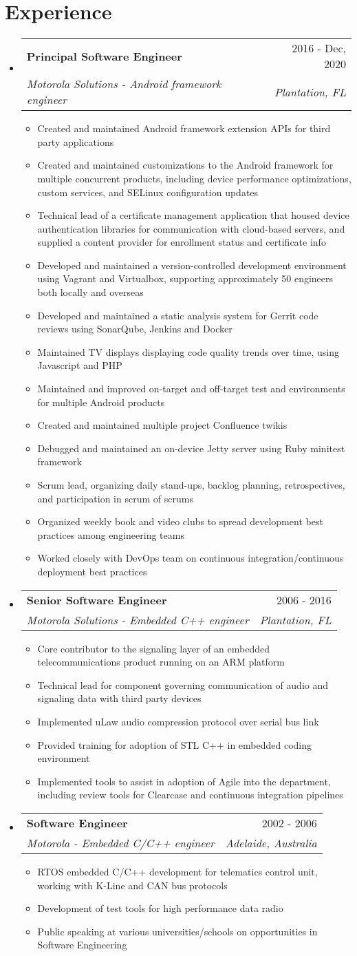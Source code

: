 \documentclass[letterpaper,11pt]{article}
\makeatletter
\newcommand{\resumeItem}[1]{
  \item\small{
    {#1 \vspace{-2pt}}
  }
}
\newcommand{\resumeSubheading}[4]{
  \vspace{-2pt}\item
    \begin{tabular*}{0.97\textwidth}[t]{l@{\extracolsep{\fill}}r}
      \textbf{#1} & #2 \\
      \textit{\small#3} & \textit{\small #4} \\
    \end{tabular*}\vspace{-7pt}
}
\newcommand{\resumeSubHeadingListStart}{\begin{itemize}[leftmargin=0.15in, label={}]}
\newcommand{\resumeSubHeadingListEnd}{\end{itemize}}
\newcommand{\resumeItemListStart}{\begin{itemize}}
\newcommand{\resumeItemListEnd}{\end{itemize}\vspace{-5pt}}
\makeatother
\begin{document}
\section{Experience}
  \resumeSubHeadingListStart
    \resumeSubheading
      {Principal Software Engineer}{2016 - Dec, 2020}
      {Motorola Solutions - Android framework engineer}{Plantation, FL}
      \resumeItemListStart
        \resumeItem{Created and maintained Android framework extension APIs for third party applications}
        \resumeItem{Created and maintained customizations to the Android framework for multiple concurrent products, including device performance optimizations, custom services, and SELinux configuration updates}
        \resumeItem{Technical lead of a certificate management application that housed device authentication libraries for communication with cloud-based servers, and supplied a content provider for enrollment status and certificate info}  
        \resumeItem{Developed and maintained a version-controlled development environment using Vagrant and Virtualbox, supporting approximately 50 engineers both locally and overseas}
        \resumeItem{Developed and maintained a static analysis system for Gerrit code reviews using SonarQube, Jenkins and Docker}
        \resumeItem{Maintained TV displays displaying code quality trends over time, using Javascript and PHP}
        \resumeItem{Maintained and improved on-target and off-target test and environments for multiple Android products}
        \resumeItem{Created and maintained multiple project Confluence twikis}
        \resumeItem{Debugged and maintained an on-device Jetty server using Ruby minitest framework}
        \resumeItem{Scrum lead, organizing daily stand-ups, backlog planning, retrospectives, and participation in scrum of scrums}
        \resumeItem{Organized weekly book and video clubs to spread development best practices among engineering teams}
        \resumeItem{Worked closely with DevOps team on continuous integration/continuous deployment best practices}
    \resumeItemListEnd
    \resumeSubheading
      {Senior Software Engineer}{2006 - 2016}
      {Motorola Solutions - Embedded C++ engineer}{Plantation, FL}
      \resumeItemListStart
      \resumeItem{Core contributor to the signaling layer of an embedded telecommunications product running on an ARM platform}
      \resumeItem{Technical lead for component governing communication of audio and signaling data with third party devices}
      \resumeItem{Implemented uLaw audio compression protocol over serial bus link}
      \resumeItem{Provided training for adoption of STL C++ in embedded coding environment}
      \resumeItem{Implemented tools to assist in adoption of Agile into the department, including review tools for Clearcase and continuous integration pipelines}
    \resumeItemListEnd
    \resumeSubheading
      {Software Engineer}{2002 - 2006}
      {Motorola - Embedded C/C++ engineer}{Adelaide, Australia}
      \resumeItemListStart
      \resumeItem{RTOS embedded C/C++ development for telematics control unit, working with K-Line and CAN bus protocols}
      \resumeItem{Development of test tools for high performance data radio}
      \resumeItem{Public speaking at various universities/schools on opportunities in Software Engineering}
    \resumeItemListEnd
  \resumeSubHeadingListEnd
\end{document}
